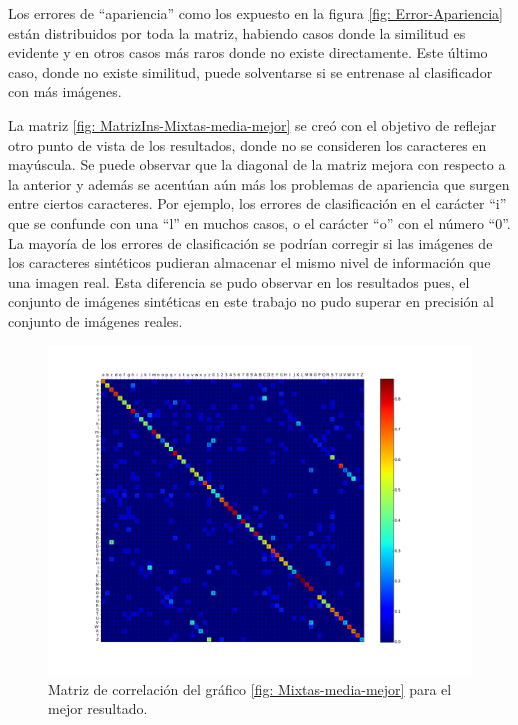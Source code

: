 	Los errores de ``apariencia'' como los expuesto en la figura \ref{fig: Error-Apariencia} están distribuidos por toda la matriz, habiendo casos donde la similitud es evidente y en otros casos más raros donde no existe directamente. Este último caso, donde no existe similitud, puede solventarse si se entrenase al clasificador con más imágenes.

	La matriz \ref{fig: MatrizIns-Mixtas-media-mejor} se creó con el objetivo de reflejar otro punto de vista de los resultados, donde no se consideren los caracteres en mayúscula. Se puede observar que la diagonal de la matriz mejora con respecto a la anterior y además se acentúan aún más los problemas de apariencia que surgen entre ciertos caracteres. Por ejemplo, los errores de clasificación en el carácter ``i'' que se confunde con una ``l'' en muchos casos, o el carácter ``o'' con el número ``0''. La mayoría de los errores de clasificación se podrían corregir si las imágenes de los caracteres sintéticos pudieran almacenar el mismo nivel de información que una imagen real. Esta diferencia se pudo observar en los resultados pues, el conjunto de imágenes sintéticas en este trabajo no pudo superar en precisión al conjunto de imágenes reales.

			\begin{figure}[!htbp]
				\centerline{\includegraphics[scale=0.4]{img/resultados/mixtas/best_mean_matrix_Alpha0,01_2040-4.png}}
				\caption[Mixtas Matriz expon]{Matriz de correlación del gráfico \ref{fig: Mixtas-media-mejor} para el mejor resultado.}
				\label{fig: Mixtas-Matrix-media-mejor}
			\end{figure}

